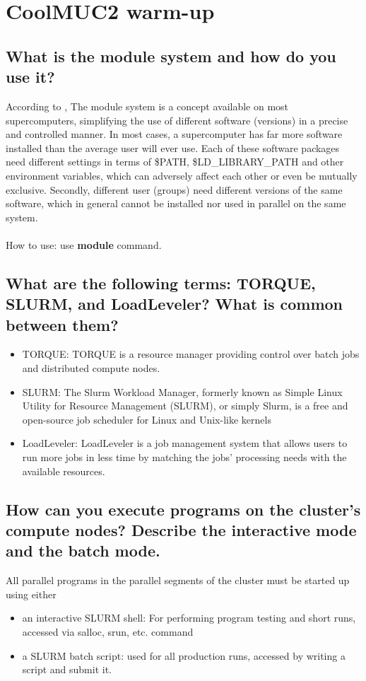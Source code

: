 \documentclass[article]{scrartcl}
\begin{document}
\maketitle
\thispagestyle{fancy}

\section{CoolMUC2 warm-up}
\subsection{What is the module system and how do you use it?}
According to \cite{modulesys}, The module system is a concept available on most supercomputers, simplifying the use of different software (versions) in a precise and controlled manner.
In most cases, a supercomputer has far more software installed than the average user will ever use. Each of these software packages need different settings in terms of \$PATH, \$LD\_LIBRARY\_PATH and other environment variables, which can adversely affect each other or even be mutually exclusive. Secondly, different user (groups) need different versions of the same software, which in general cannot be installed nor used in parallel on the same system.\\\\
How to use: use \textbf{module} command.

\subsection{What are the following terms: TORQUE, SLURM, and LoadLeveler? What is common
between them?}
\begin{itemize}
    \item TORQUE: TORQUE is a resource manager providing control over batch jobs and distributed compute nodes.
    \item SLURM: The Slurm Workload Manager, formerly known as Simple Linux Utility for Resource Management (SLURM), or simply Slurm, is a free and open-source job scheduler for Linux and Unix-like kernels
    \item LoadLeveler: LoadLeveler is a job management system that allows users to run more jobs in less time by matching the jobs' processing needs with the available resources.
\end{itemize}
\subsection{How can you execute programs on the cluster’s compute nodes? Describe the interactive mode and the batch mode.}
All parallel programs in the parallel segments of the cluster must be started up using either
\begin{itemize}
    \item an interactive SLURM shell: For performing program testing and short runs, accessed via salloc, srun, etc. command
    \item a SLURM batch script: used for all production runs, accessed by writing a script and submit it.
\end{itemize}
\end{document}
